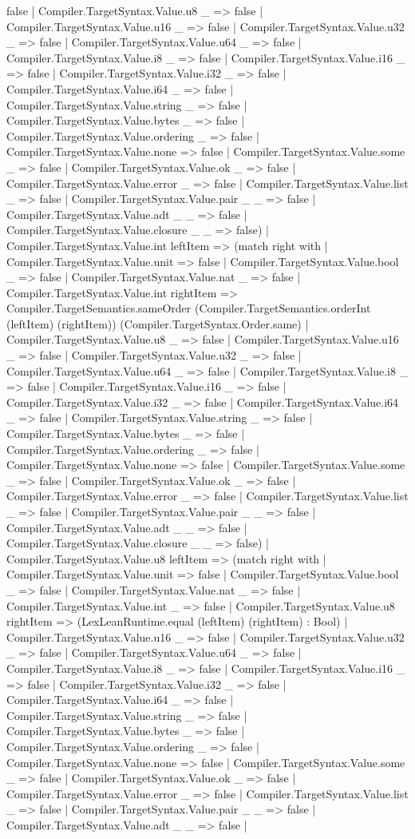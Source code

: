 \documentclass[11pt]{article}
\begin{document}
false | Compiler.TargetSyntax.Value.u8 \_ => false | Compiler.TargetSyntax.Value.u16 \_ => false | Compiler.TargetSyntax.Value.u32 \_ => false | Compiler.TargetSyntax.Value.u64 \_ => false | Compiler.TargetSyntax.Value.i8 \_ => false | Compiler.TargetSyntax.Value.i16 \_ => false | Compiler.TargetSyntax.Value.i32 \_ => false | Compiler.TargetSyntax.Value.i64 \_ => false | Compiler.TargetSyntax.Value.string \_ => false | Compiler.TargetSyntax.Value.bytes \_ => false | Compiler.TargetSyntax.Value.ordering \_ => false | Compiler.TargetSyntax.Value.none => false | Compiler.TargetSyntax.Value.some \_ => false | Compiler.TargetSyntax.Value.ok \_ => false | Compiler.TargetSyntax.Value.error \_ => false | Compiler.TargetSyntax.Value.list \_ => false | Compiler.TargetSyntax.Value.pair \_ \_ => false | Compiler.TargetSyntax.Value.adt \_ \_ => false | Compiler.TargetSyntax.Value.closure \_ \_ => false) | Compiler.TargetSyntax.Value.int leftItem => (match right with | Compiler.TargetSyntax.Value.unit => false | Compiler.TargetSyntax.Value.bool \_ => false | Compiler.TargetSyntax.Value.nat \_ => false | Compiler.TargetSyntax.Value.int rightItem => Compiler.TargetSemantics.sameOrder (Compiler.TargetSemantics.orderInt (leftItem) (rightItem)) (Compiler.TargetSyntax.Order.same) | Compiler.TargetSyntax.Value.u8 \_ => false | Compiler.TargetSyntax.Value.u16 \_ => false | Compiler.TargetSyntax.Value.u32 \_ => false | Compiler.TargetSyntax.Value.u64 \_ => false | Compiler.TargetSyntax.Value.i8 \_ => false | Compiler.TargetSyntax.Value.i16 \_ => false | Compiler.TargetSyntax.Value.i32 \_ => false | Compiler.TargetSyntax.Value.i64 \_ => false | Compiler.TargetSyntax.Value.string \_ => false | Compiler.TargetSyntax.Value.bytes \_ => false | Compiler.TargetSyntax.Value.ordering \_ => false | Compiler.TargetSyntax.Value.none => false | Compiler.TargetSyntax.Value.some \_ => false | Compiler.TargetSyntax.Value.ok \_ => false | Compiler.TargetSyntax.Value.error \_ => false | Compiler.TargetSyntax.Value.list \_ => false | Compiler.TargetSyntax.Value.pair \_ \_ => false | Compiler.TargetSyntax.Value.adt \_ \_ => false | Compiler.TargetSyntax.Value.closure \_ \_ => false) | Compiler.TargetSyntax.Value.u8 leftItem => (match right with | Compiler.TargetSyntax.Value.unit => false | Compiler.TargetSyntax.Value.bool \_ => false | Compiler.TargetSyntax.Value.nat \_ => false | Compiler.TargetSyntax.Value.int \_ => false | Compiler.TargetSyntax.Value.u8 rightItem => (LexLeanRuntime.equal (leftItem) (rightItem) : Bool) | Compiler.TargetSyntax.Value.u16 \_ => false | Compiler.TargetSyntax.Value.u32 \_ => false | Compiler.TargetSyntax.Value.u64 \_ => false | Compiler.TargetSyntax.Value.i8 \_ => false | Compiler.TargetSyntax.Value.i16 \_ => false | Compiler.TargetSyntax.Value.i32 \_ => false | Compiler.TargetSyntax.Value.i64 \_ => false | Compiler.TargetSyntax.Value.string \_ => false | Compiler.TargetSyntax.Value.bytes \_ => false | Compiler.TargetSyntax.Value.ordering \_ => false | Compiler.TargetSyntax.Value.none => false | Compiler.TargetSyntax.Value.some \_ => false | Compiler.TargetSyntax.Value.ok \_ => false | Compiler.TargetSyntax.Value.error \_ => false | Compiler.TargetSyntax.Value.list \_ => false | Compiler.TargetSyntax.Value.pair \_ \_ => false | Compiler.TargetSyntax.Value.adt \_ \_ => false | 
\end{document}

